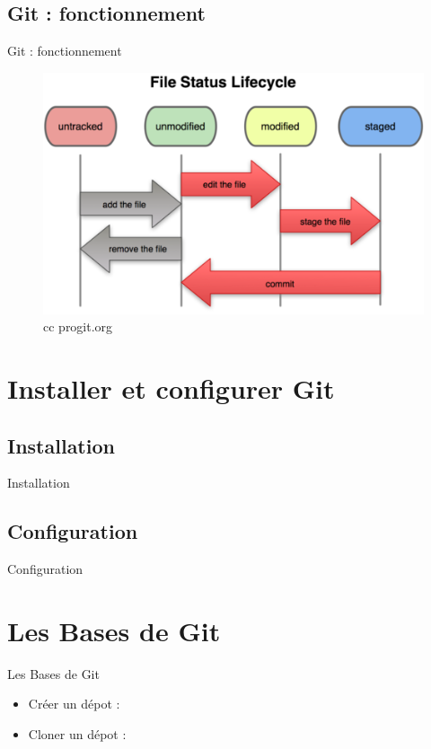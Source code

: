 \documentclass{beamer}
\begin{document}
\subsection*{Git : fonctionnement}
\begin{frame}{Git : fonctionnement}
  \begin{figure}
    \begin{center}
      \includegraphics[scale=0.7]{Status_lifecycle.png}
    \end{center}
    \tiny
    \caption{cc progit.org}
    \label{cc progit.org}
  \end{figure}
\end{frame}

\section{Installer et configurer Git}

\subsection*{Installation}
\begin{frame}{Installation}
\end{frame}

\subsection*{Configuration}
\begin{frame}{Configuration}
\end{frame}

\section{Les Bases de Git}
\begin{frame}{Les Bases de Git}
  \begin{itemize}
    \item Créer un dépot : 
    \item Cloner un dépot :
  \end{itemize}
  
\end{frame}
\end{document}
